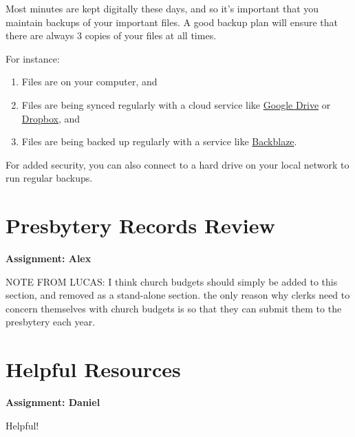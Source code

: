 \documentclass[
]{book}
\providecommand{\tightlist}{%
  \setlength{\itemsep}{0pt}\setlength{\parskip}{0pt}}
\begin{document}
Most minutes are kept digitally these days, and so it's important that you maintain backups of your important files. A good backup plan will ensure that there are always 3 copies of your files at all times.

For instance:

\begin{enumerate}
\def\labelenumi{\arabic{enumi}.}
\tightlist
\item
  Files are on your computer, and
\item
  Files are being synced regularly with a cloud service like \href{https://drive.google.com}{Google Drive} or \href{https://dropbox.com}{Dropbox}, and
\item
  Files are being backed up regularly with a service like \href{https://www.backblaze.com}{Backblaze}.
\end{enumerate}

For added security, you can also connect to a hard drive on your local network to run regular backups.

\hypertarget{presbytery-records-review}{%
\chapter{Presbytery Records Review}\label{presbytery-records-review}}

\textbf{Assignment: Alex}

NOTE FROM LUCAS: I think church budgets should simply be added to this section, and removed as a stand-alone section. the only reason why clerks need to concern themselves with church budgets is so that they can submit them to the presbytery each year.

\hypertarget{helpful-resources}{%
\chapter{Helpful Resources}\label{helpful-resources}}

\textbf{Assignment: Daniel}

Helpful!
\end{document}
